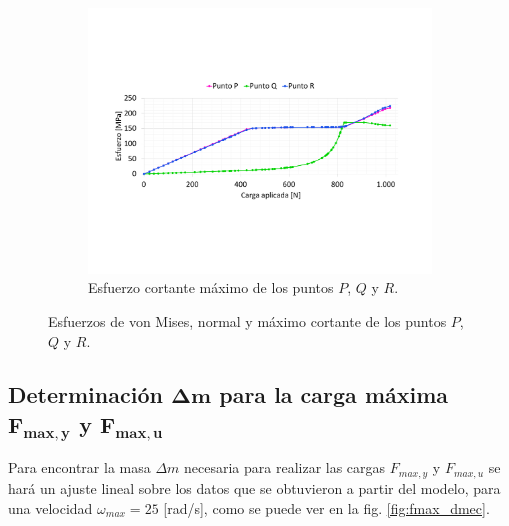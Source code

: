 \begin{figure}[p]
	\begin{subfigure}{1\linewidth}
		\centering
		\includegraphics[width=\linewidth, trim={2cm 5cm 2cm 5cm},clip]{Imagenes/esfpqr_ms.pdf}
		\caption{Esfuerzo cortante máximo de los puntos $P$, $Q$ y $R$.}
		\label{fig:esfpqr_ms}
	\end{subfigure}
\caption{Esfuerzos de von Mises, normal y máximo cortante de los puntos $P$, $Q$ y $R$.}
\label{fig:esf_pqr}
\end{figure}

\newpage

\subsection{Determinación $\mathbf{\Delta m}$ para la carga máxima $\mathbf{F_{max,y}}$ y $\mathbf{F_{max,u}}$}

Para encontrar la masa $\Delta m$ necesaria para realizar las cargas $F_{max,y}$ y $F_{max,u}$ se hará un ajuste lineal sobre los datos que se obtuvieron a partir del modelo, para una velocidad $\omega_{max}= 25$ [rad/s], como se puede ver en la fig. \ref{fig:fmax_dmec}.

